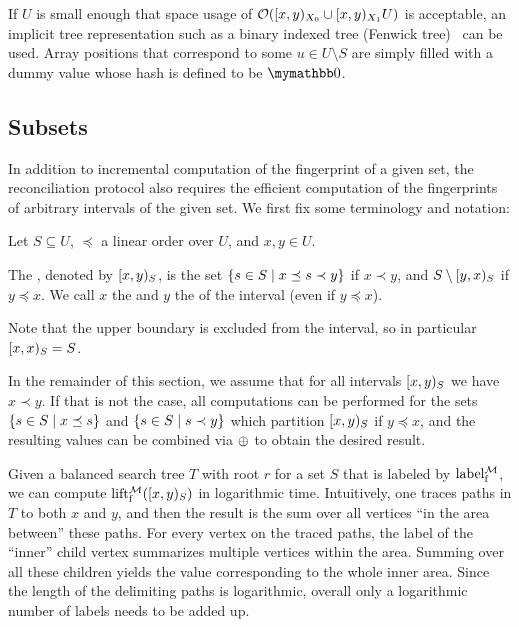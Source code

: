 If $U$ is small enough that space usage of $\mathcal{O}([{x},{y})_{X_0} \cup [{x},{y})_{X_1}{U})$ is acceptable, an implicit tree representation such as a binary indexed tree (Fenwick tree)~\cite{fenwick1994new} can be used. Array positions that correspond to some $u \in U \setminus S$ are simply filled with a dummy value whose hash is defined to be $\neutraladd$.

\subsection{Subsets}

In addition to incremental computation of the fingerprint of a given set, the reconciliation protocol also requires the efficient computation of the fingerprints of arbitrary intervals of the given set. We first fix some terminology and notation:

\begin{definition}
\label{def-interval}
Let $S \subseteq U$, $\preceq$ a linear order over $U$, and $x, y \in U$.

The , denoted by $[{x},{y})_{S}$, is the set $\{s \in S \mid x \preceq s \prec y\}$ if $x \prec y$, and $S \setminus [{y},{x})_{S}$ if $y \preceq x$. We call $x$ the  and $y$ the  of the interval (even if $y \preceq x$).

Note that the upper boundary is excluded from the interval, so in particular $[{x},{x})_{S} = S$.
\end{definition}

In the remainder of this section, we assume that for all intervals $[{x},{y})_{S}$ we have $x \prec y$. If that is not the case, all computations can be performed for the sets $\{s \in S \mid x \preceq s\}$ and $\{s \in S \mid s \prec y\}$ which partition $[{x},{y})_{S}$ if $y \preceq x$, and the resulting values can be combined via $\oplus$ to obtain the desired result.

Given a balanced search tree $T$ with root $r$ for a set $S$ that is labeled by $\operatorname{label_{\operatorname{f}}^{\mathcal{M}}}$, we can compute $\operatorname{lift_{\operatorname{f}}^{\mathcal{M}}}([{x},{y})_{S})$ in logarithmic time. Intuitively, one traces paths in $T$ to both $x$ and $y$, and then the result is the sum over all vertices ``in the area between'' these paths. For every vertex on the traced paths, the label of the ``inner'' child vertex summarizes multiple vertices within the area. Summing over all these children yields the value corresponding to the whole inner area. Since the length of the delimiting paths is logarithmic, overall only a logarithmic number of labels needs to be added up.

